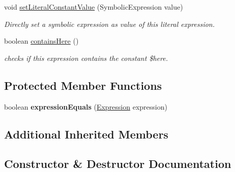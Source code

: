 \begin{DoxyCompactItemize}
\item 
void \hyperlink{classedu_1_1udel_1_1cis_1_1vsl_1_1civl_1_1model_1_1common_1_1expression_1_1CommonArrayLiteralExpression_acd3b190b3f572cd65c221a5f4e9ca1e9}{set\+Literal\+Constant\+Value} (Symbolic\+Expression value)
\begin{DoxyCompactList}\small\item\em Directly set a symbolic expression as value of this literal expression. \end{DoxyCompactList}\item 
boolean \hyperlink{classedu_1_1udel_1_1cis_1_1vsl_1_1civl_1_1model_1_1common_1_1expression_1_1CommonArrayLiteralExpression_aae8a012f64a4dcff52aad828c0545c1d}{contains\+Here} ()
\begin{DoxyCompactList}\small\item\em checks if this expression contains the constant \$here. \end{DoxyCompactList}\end{DoxyCompactItemize}
\subsection*{Protected Member Functions}
\begin{DoxyCompactItemize}
\item 
\hypertarget{classedu_1_1udel_1_1cis_1_1vsl_1_1civl_1_1model_1_1common_1_1expression_1_1CommonArrayLiteralExpression_a7cb9dbed26b51765b7e938257f67ce30}{}boolean {\bfseries expression\+Equals} (\hyperlink{interfaceedu_1_1udel_1_1cis_1_1vsl_1_1civl_1_1model_1_1IF_1_1expression_1_1Expression}{Expression} expression)\label{classedu_1_1udel_1_1cis_1_1vsl_1_1civl_1_1model_1_1common_1_1expression_1_1CommonArrayLiteralExpression_a7cb9dbed26b51765b7e938257f67ce30}

\end{DoxyCompactItemize}
\subsection*{Additional Inherited Members}


\subsection{Constructor \& Destructor Documentation}
\hypertarget{classedu_1_1udel_1_1cis_1_1vsl_1_1civl_1_1model_1_1common_1_1expression_1_1CommonArrayLiteralExpression_a9c30a97d315de4f5727c650e5dba9ab9}{}

